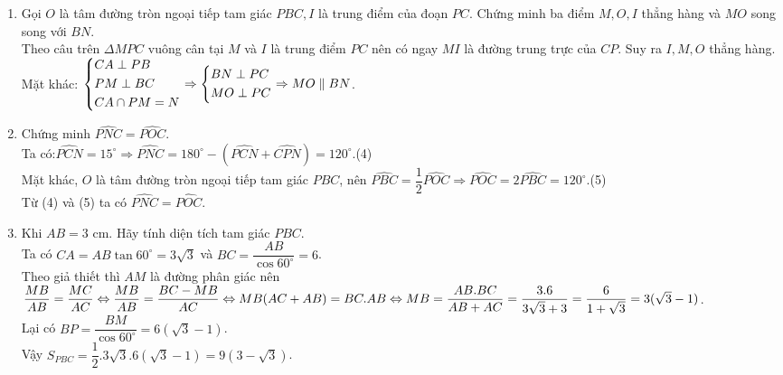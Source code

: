 \begin{ex}
{\begin{enumerate}
{
}
\item Gọi $O$ là tâm đường tròn ngoại tiếp tam giác $PBC, I$ là trung điểm của đoạn $PC$. Chứng minh ba điểm $M,O,I$ thẳng hàng và $MO$ song song với $BN$.\\
Theo câu trên $\Delta MPC$ vuông cân tại $M$ và $I$ là trung điểm $PC$ nên có ngay $MI$ là đường trung trực của $CP$. Suy ra $I,M,O$ thẳng hàng.\\
Mặt khác: $\left\{\begin{aligned}&CA\perp PB\\&PM\perp BC\\&CA\cap PM=N\end{aligned}\right.\Rightarrow \left\{\begin{aligned}&BN\perp PC\\& MO\perp PC\end{aligned}\right.\Rightarrow MO\parallel BN$.
\item Chứng minh $\widehat{PNC}=\widehat{POC}$.\\
Ta có:$\widehat{PCN}=15^\circ\Rightarrow \widehat{PNC}=180^\circ-(\widehat{PCN}+\widehat{CPN})=120^\circ$.\hfill(4)\\
Mặt khác, $O$ là tâm đường tròn ngoại tiếp tam giác $PBC$, nên $\widehat{PBC}=\dfrac{1}{2}\widehat{POC}\Rightarrow \widehat{POC}=2\widehat{PBC}=120^\circ$.\hfill(5)\\
Từ (4) và (5) ta có $\widehat{PNC}=\widehat{POC}$.
\item Khi $AB =3$ cm. Hãy tính diện tích tam giác $PBC$.\\
Ta có $CA=AB\tan 60^\circ=3\sqrt{3}$ và $BC=\dfrac{AB}{\cos 60^\circ}=6$.\\
Theo giả thiết thì $AM$ là đường phân giác nên\\ $\dfrac{MB}{AB}=\dfrac{MC}{AC}\Leftrightarrow \dfrac{MB}{AB}=\dfrac{BC-MB}{AC}\Leftrightarrow MB(AC+AB)=BC.AB\\
\Leftrightarrow MB=\dfrac{AB.BC}{AB+AC}=\dfrac{3.6}{3\sqrt{3}+3}=\dfrac{6}{1+\sqrt{3}}=3(\sqrt{3}-1)$.\\
Lại có $BP=\dfrac{BM}{\cos 60^\circ}=6(\sqrt{3}-1)$.\\
Vậy $S_{PBC}=\dfrac{1}{2}.3\sqrt{3}.6(\sqrt{3}-1)=9(3-\sqrt{3})$.
\end{enumerate}
}
\end{ex}
